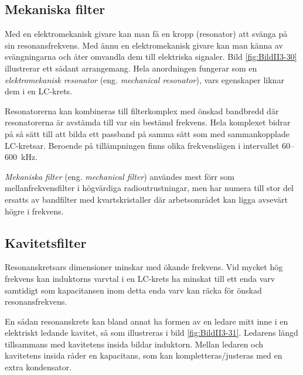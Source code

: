 \subsection{Mekaniska filter}

Med en elektromekanisk givare kan man få en kropp (resonator) att svänga på sin
resonansfrekvens.
Med ännu en elektromekanisk givare kan man känna av svängningarna och
åter omvandla dem till elektriska signaler.
Bild \ref{fig:BildII3-30} illustrerar ett sådant arrangemang.
Hela anordningen fungerar som en \emph{elektromekanisk resonator} (eng.
\emph{mechanical resonator}), vars egenskaper liknar dem i en LC-krets.


Resonatorerna kan kombineras till filterkomplex med önskad bandbredd där
resonatorerna är avstämda till var sin bestämd frekvens.
Hela komplexet bidrar på så sätt till att bilda ett passband på samma sätt som
med sammankopplade LC-kretsar.
Beroende på tillämpningen finns olika frekvenslägen i intervallet 60--600~kHz.

\emph{Mekaniska filter} (eng. \emph{mechanical filter}) användes mest förr som
mellanfrekvensfilter i högvärdiga radioutrustningar, men har numera till stor
del ersatts av bandfilter med kvartskristaller där arbetsområdet kan ligga
avsevärt högre i frekvens.

\subsection{Kavitetsfilter}


Resonanskretsars dimensioner minskar med ökande frekvens.
Vid mycket hög frekvens kan induktorns varvtal i en LC-krets ha minskat till
ett enda varv samtidigt som kapacitansen inom detta enda varv kan räcka för
önskad resonansfrekvens.

En sådan resonanskrets kan bland annat ha formen av en ledare mitt inne i en
elektriskt ledande kavitet, så som illustreras i bild \ref{fig:BildII3-31}.
Ledarens längd tillsammans med kavitetens insida bildar induktorn.
Mellan ledaren och kavitetens insida råder en kapacitans, som kan
kompletteras/justeras med en extra kondensator.

